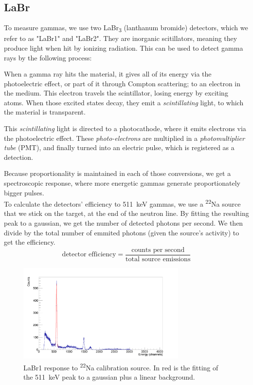 \documentclass[a4paper,12pt]{report}
\newcommand{\Na}{\textsuperscript{22}Na }
\begin{document}
\subsection{LaBr}
To measure gammas, we use two LaBr\textsubscript{3} (lanthanum bromide) detectors, which we refer to as "LaBr1" and "LaBr2".
They are inorganic scitillators, meaning they produce light when hit by ionizing radiation.
This can be used to detect gamma rays by the following process:

When a gamma ray hits the material, it gives all of its energy via the photoelectric effect, or part of it through Compton scattering; to an electron in the medium.
This electron travels the scintillator, losing energy by exciting atoms.
When those excited states decay, they emit a \textit{scintillating} light, to which the material is transparent.

This \textit{scintillating} light is directed to a photocathode, where it emits electrons via the photoelectric effect.
These \textit{photo-electrons} are multiplied in a \textit{photomultiplier tube} (PMT), and finally turned into an electric pulse, which is registered as a detection.

Because proportionality is maintained in each of those conversions, we get a spectroscopic response, where more energetic gammas generate proportionately bigger pulses.
\\

To calculate the detectors' efficiency to \qty{511}{\keV} gammas, we use a \Na source that we stick on the target, at the end of the neutron line.
By fitting the resulting peak to a gaussian, we get the number of detected photons per second.
We then divide by the total number of emmited photons (given the source's activity) to get the efficiency.
\begin{equation}
	\text{detector efficiency} = \frac{\text{counts per second}}{\text{total source emissions}}
\end{equation}

\begin{figure}[H]
	\centering
	\includegraphics[width=0.75\textwidth]{labr_na22_calibration.png}
	\caption{LaBr1 response to \Na calibration source. In red is the fitting of the \qty{511}{\keV} peak to a gaussian plus a linear background.}
	\label{labr_na22_calibration}
\end{figure}
\end{document}
